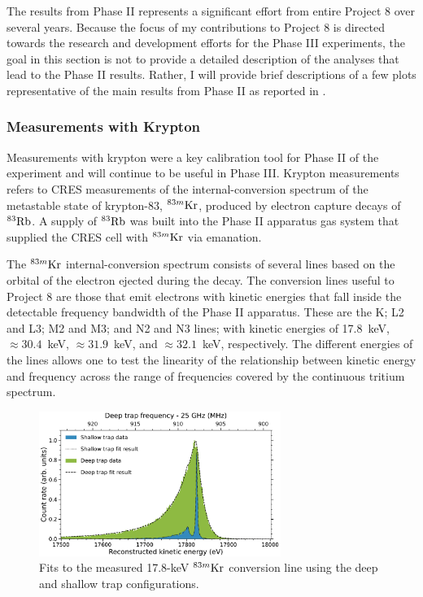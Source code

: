 The results from Phase II represents a significant effort from entire Project 8 over several years. Because the focus of my contributions to Project 8 is directed towards the research and development efforts for the Phase III experiments, the goal in this section is not to provide a detailed description of the analyses that lead to the Phase II results. Rather, I will provide brief descriptions of a few plots representative of the main results from Phase II as reported in \cite{p8prl2023,p8prc2023}.

\subsubsection*{Measurements with Krypton}

Measurements with krypton were a key calibration tool for Phase II of the experiment and will continue to be useful in Phase III. Krypton measurements refers to CRES measurements of the internal-conversion spectrum of the metastable state of krypton-83, $^{83m}\rm{Kr}$, produced by electron capture decays of $^{83}\rm{Rb}$. A supply of $^{83}\rm{Rb}$ was built into the Phase II apparatus gas system that supplied the CRES cell with $^{83m}\rm{Kr}$ via emanation.

The $^{83m}\rm{Kr}$ internal-conversion spectrum consists of several lines based on the orbital of the electron ejected during the decay. The conversion lines useful to Project 8 are those that emit electrons with kinetic energies that fall inside the detectable frequency bandwidth of the Phase II apparatus. These are the K; L2 and L3; M2 and M3; and N2 and N3 lines; with kinetic energies of 17.8~keV, $\approx 30.4$~keV, $\approx 31.9$~keV, and $\approx 32.1$~keV, respectively. The different energies of the lines allows one to test the linearity of the relationship between kinetic energy and frequency across the range of frequencies covered by the continuous tritium spectrum.

\begin{figure}[htbp]
    \centering
    \includegraphics[width=0.7\textwidth]{figs/Chapter-3/kr_fit.pdf}
    \caption{Fits to the measured 17.8-keV $^{83m}\rm{Kr}$ conversion line using the deep and shallow trap configurations. }
    \label{fig:chap3-krypton-spec-fit}
\end{figure}

